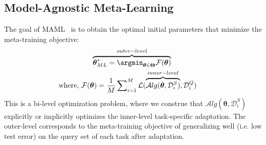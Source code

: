 

\subsection{Model-Agnostic Meta-Learning}
The goal of MAML~\cite{finn2017model} is to obtain the optimal initial parameters that minimize the meta-training objective:
\begin{equation}
\begin{aligned}
    \label{meta-objective}
    \overbrace{\boldsymbol{\theta}^*_{ML}= \argmin_{\boldsymbol{\theta} \in \boldsymbol{\Theta}}{\mathcal{F}(\boldsymbol{\theta})}}^{outer-level}\text{\hspace{1.7cm}}\\
    \text{where, }\mathcal{F}(\boldsymbol{\theta}) = \frac{1}{M}\sum\nolimits_{i=1}^{M}\mathcal{L}(\overbrace{\mathcal{A}lg(\boldsymbol{\theta}, \mathcal{D}_{i}^{S})}^{inner-level}, \mathcal{D}_{i}^{Q})\text{\hspace{0.5cm}}
\end{aligned}
\end{equation}
This is a bi-level optimization problem, where we construe that $\mathcal{A}lg(\boldsymbol{\theta}, \mathcal{D}_{i}^{S})$ explicitly or implicitly optimizes the inner-level task-specific adaptation. The outer-level corresponds to the meta-training objective of generalizing well (i.e. low test error) on the query set of each task after adaptation. 
 
